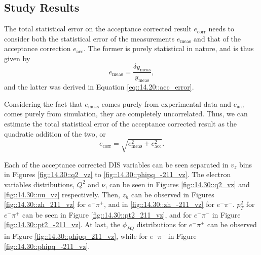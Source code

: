 \subsection{Study Results}
\label{14.30::study_results}


    The total statistical error on the acceptance corrected result $e_\text{corr}$ needs to consider both the statistical error of the measurements $e_\text{meas}$ and that of the acceptance correction $e_\text{acc}$.
    The former is purely statistical in nature, and is thus given by
    \begin{equation*}
        e_\text{meas} = \frac{\delta y_\text{meas}}{y_\text{meas}},
    \end{equation*}
    and the latter was derived in Equation \eqref{eq::14.20::acc_error}.

    Considering the fact that $e_\text{meas}$ comes purely from experimental data and $e_\text{acc}$ comes purely from simulation, they are completely uncorrelated.
    Thus, we can estimate the total statistical error of the acceptance corrected result as the quadratic addition of the two, or
    \begin{equation*}
        e_\text{corr} = \sqrt{e_\text{meas}^2 + e_\text{acc}^2}.
    \end{equation*}


    Each of the acceptance corrected DIS variables can be seen separated in $v_z$ bins in Figures \ref{fig::14.30::q2_vz} to \ref{fig::14.30::phipq_-211_vz}.
    The electron variables distributions, $Q^2$ and $\nu$, can be seen in Figures \ref{fig::14.30::q2_vz} and \ref{fig::14.30::nu_vz} respectively.
    Then, $z_h$ can be observed in Figures \ref{fig::14.30::zh_211_vz} for $e^-\pi^+$, and in \ref{fig::14.30::zh_-211_vz} for $e^-\pi^-$.
    $p_T^2$ for $e^-\pi^+$ can be seen in Figure \ref{fig::14.30::pt2_211_vz}, and for $e^-\pi^-$ in Figure \ref{fig::14.30::pt2_-211_vz}.
    At last, the $\phi_{PQ}$ distributions for $e^-\pi^+$ can be observed in Figure \ref{fig::14.30::phipq_211_vz}, while for $e^-\pi^-$ in Figure \ref{fig::14.30::phipq_-211_vz}.

